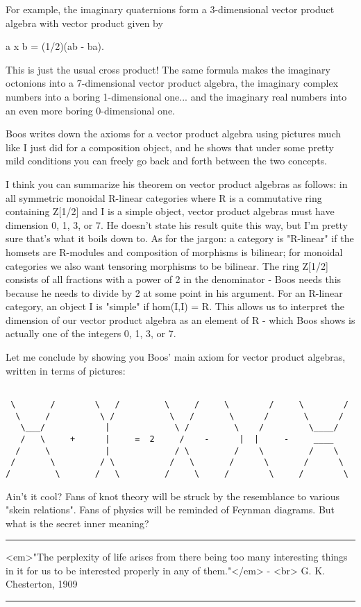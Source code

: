 For example, the imaginary quaternions form a 3-dimensional vector 
product algebra with vector product given by

a x b = (1/2)(ab - ba).

This is just the usual cross product!  The same formula makes the 
imaginary octonions into a 7-dimensional vector product algebra, 
the imaginary complex numbers into a boring 1-dimensional one... 
and the imaginary real numbers into an even more boring 0-dimensional 
one.

Boos writes down the axioms for a vector product algebra using pictures 
much like I just did for a composition object, and he shows that under 
some pretty mild conditions you can freely go back and forth between 
the two concepts.  

I think you can summarize his theorem on vector product algebras as
follows: in all symmetric monoidal R-linear categories where R is a
commutative ring containing Z[1/2] and I is a simple object, vector
product algebras must have dimension 0, 1, 3, or 7.  He doesn't state
his result quite this way, but I'm pretty sure that's what it boils down
to.  As for the jargon: a category is "R-linear" if the
homsets are R-modules and composition of morphisms is bilinear; for
monoidal categories we also want tensoring morphisms to be bilinear.
The ring Z[1/2] consists of all fractions with a power of 2 in the
denominator - Boos needs this because he needs to divide by 2 at some
point in his argument.  For an R-linear category, an object I is
"simple" if hom(I,I) = R.  This allows us to interpret the
dimension of our vector product algebra as an element of R - which Boos
shows is actually one of the integers 0, 1, 3, or 7.

Let me conclude by showing you Boos' main axiom for vector
product algebras, written in terms of pictures:


\begin{verbatim}

 \       /        \   /         \     /     \        /     \        /
  \     /          \ /           \   /       \      /       \      /
   \___/            |             \ /         \    /         \____/ 
   /   \     +      |     =  2     /    -      |  |     -     ____    
  /     \           |             / \         /    \         /    \
 /       \         / \           /   \       /      \       /      \
/         \       /   \         /     \     /        \     /        \
\end{verbatim}
    
Ain't it cool?  Fans of knot theory will be struck by the resemblance
to various "skein relations".  Fans of physics will be reminded of
Feynman diagrams.  But what is the secret inner meaning?    



 \par\noindent\rule{\textwidth}{0.4pt}
<em>"The perplexity of life arises from there being too many
interesting things in it for us to be interested properly
in any of them."</em> - <br> G. K. Chesterton, 1909
\par\noindent\rule{\textwidth}{0.4pt}

